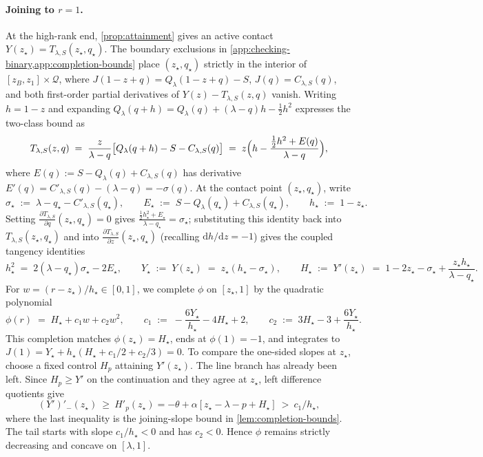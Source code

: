 \documentclass[11pt]{article}
\numberwithin{equation}{section}
\theoremstyle{plain}
\theoremstyle{definition}
\newcommand{\1}{\mathbf{1}}
\newcommand{\calQ}{\mathcal{Q}}
\begin{document}
\paragraph{Joining to $r = 1$.}
At the high-rank end, \cref{prop:attainment} gives an active contact $Y(z_\star) = T_{\lambda, S}(z_\star, q_\star)$. The boundary exclusions in \cref{app:checking-binary,app:completion-bounds} place $(z_\star, q_\star)$ strictly in the interior of $[z_B, z_1] \times \calQ$, where $J(1 - z + q) = Q_\lambda(1 - z + q) - S$, $J(q) = C_{\lambda, S}(q)$, and both first-order partial derivatives of $Y(z) - T_{\lambda, S}(z, q)$ vanish. Writing $h = 1 - z$ and expanding $Q_\lambda(q + h) = Q_\lambda(q) + (\lambda - q)h - \frac{1}{2}h^2$ expresses the two-class bound as
\[
  T_{\lambda, S}(z, q) \;=\; \frac{z}{\lambda - q}\bigl[Q_\lambda(q + h) - S - C_{\lambda, S}(q)\bigr]
  \;=\; z\Bigl(h - \frac{\frac{1}{2}h^2 + E(q)}{\lambda - q}\Bigr),
\]
where $E(q) := S - Q_\lambda(q) + C_{\lambda, S}(q)$ has derivative $E'(q) = C'_{\lambda, S}(q) - (\lambda - q) = -\sigma(q)$. At the contact point $(z_\star, q_\star)$, write
\[
  \sigma_\star \;:=\; \lambda - q_\star - C'_{\lambda, S}(q_\star),
  \qquad
  E_\star \;:=\; S - Q_\lambda(q_\star) + C_{\lambda, S}(q_\star),
  \qquad
  h_\star \;:=\; 1 - z_\star.
\]
Setting $\frac{\partial T_{\lambda, S}}{\partial q}(z_\star, q_\star) = 0$ gives $\frac{\frac{1}{2}h_\star^2 + E_\star}{\lambda - q_\star} = \sigma_\star$; substituting this identity back into $T_{\lambda, S}(z_\star, q_\star)$ and into $\frac{\partial T_{\lambda, S}}{\partial z}(z_\star, q_\star)$ (recalling $\mathrm{d}h/\mathrm{d}z = -1$) gives the coupled tangency identities
\begin{equation}
  h_\star^2 \;=\; 2(\lambda - q_\star)\sigma_\star - 2E_\star,
  \qquad
  Y_\star \;:=\; Y(z_\star) \;=\; z_\star(h_\star - \sigma_\star),
  \qquad
  H_\star \;:=\; Y'(z_\star) \;=\; 1 - 2z_\star - \sigma_\star + \frac{z_\star h_\star}{\lambda - q_\star}.
  \label{eq:tangency-identities}
\end{equation}
For $w = (r - z_\star)/h_\star \in [0, 1]$, we complete $\phi$ on $[z_\star, 1]$ by the quadratic polynomial
\begin{equation}
  \phi(r) \;=\; H_\star + c_1 w + c_2 w^2,
  \qquad
  c_1 \;:=\; -\frac{6Y_\star}{h_\star} - 4H_\star + 2,
  \qquad
  c_2 \;:=\; 3H_\star - 3 + \frac{6Y_\star}{h_\star}.
  \label{eq:tail-quadratic}
\end{equation}
This completion matches $\phi(z_\star) = H_\star$, ends at $\phi(1) = -1$, and integrates to $J(1) = Y_\star + h_\star(H_\star + c_1/2 + c_2/3) = 0$. To compare the one-sided slopes at $z_\star$, choose a fixed control $H_p$ attaining $Y'(z_\star)$. The line branch has already been left. Since $H_p\ge Y'$ on the continuation and they agree at $z_\star$, left difference quotients give
\[
 (Y')'_-(z_\star)\ \ge\ H'_p(z_\star)
 =-\theta+\alpha[z_\star-\lambda-p+H_\star]\ >\ c_1/h_\star ,
\]
where the last inequality is the joining-slope bound in \cref{lem:completion-bounds}. The tail starts with slope $c_1/h_\star<0$ and has $c_2<0$. Hence $\phi$ remains strictly decreasing and concave on $[\lambda,1]$.
\end{document}
